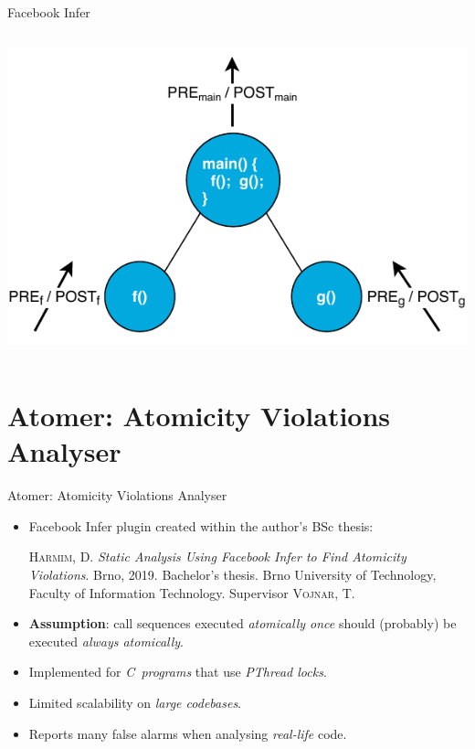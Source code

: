 \documentclass[10pt, xcolor=pdflatex, hyperref={unicode}, aspectratio=169]{beamer}
\begin{document}
\begin{frame}{Facebook Infer}
\begin{columns}
        \begin{column}{.45 \linewidth}
            \centering
            \includegraphics[width=1 \linewidth]{infer.pdf}
        \end{column}
    \end{columns}
\end{frame}




\section{Atomer: Atomicity Violations Analyser}
\begin{frame}{Atomer: Atomicity Violations Analyser}
    \begin{itemize}\setlength\itemsep{1.5em}
        \item \alert{Facebook Infer plugin} created within the author's BSc thesis:
            \medskip
            \begin{thebibliography}{1}
                \textsc{Harmim, D.} \textit{Static Analysis Using Facebook Infer to Find Atomicity Violations}. Brno, 2019. Bachelor's thesis. Brno University of Technology, Faculty of Information Technology. Supervisor \textsc{Vojnar, T.}
            \end{thebibliography}

        \item \textbf{Assumption}: \alert{call sequences} executed \emph{atomically once} should (probably) be executed \emph{always atomically}.

        \item Implemented for \emph{C~programs} that use \emph{PThread locks}.

        \item Limited \alert{scalability} on \emph{large codebases}.

        \item Reports many \alert{false alarms} when analysing \emph{real-life} code.
    \end{itemize}
\end{frame}
\end{document}
